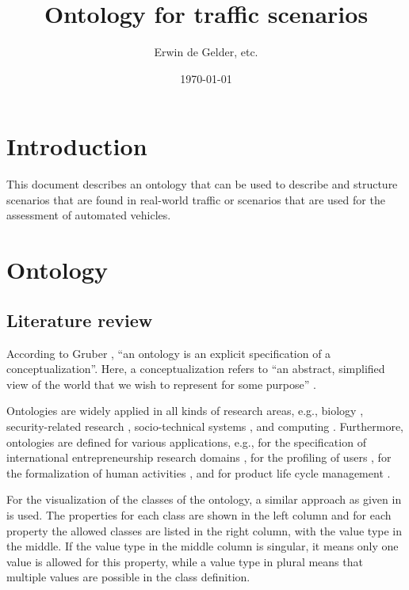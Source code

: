 \documentclass[10pt,final,a4paper,oneside,onecolumn]{article}
\def\reptitle{Ontology for traffic scenarios}
\def\repauthor{Erwin de Gelder, etc.}
\theoremstyle{plain}\newtheorem{definition}{Definition}[section]    %
\theoremstyle{definition}\newtheorem{example}{Example}[section]     %
\theoremstyle{remark}\newtheorem{remarkenv}{Remark}[section]        %
\begin{document}

\title{\textbf{\reptitle}}
\author{\repauthor}
\date{\today}
\maketitle

\tableofcontents

\newpage

\section{Introduction}
\label{sec:introduction}

This document describes an ontology that can be used to describe and structure scenarios that are found in real-world traffic or scenarios that are used for the assessment of automated vehicles.

\section{Ontology}
\label{sec:ontology}

\subsection{Literature review}
\label{sec:ontology literature}

According to Gruber \cite{gruber1993ontology}, ``an ontology is an explicit specification of a conceptualization''. Here, a conceptualization refers to ``an abstract, simplified view of the world that we wish to represent for some purpose'' \cite{gruber1993ontology}. 

Ontologies are widely applied in all kinds of research areas, e.g., biology \cite{gkoutos2004mouse}, security-related research \cite{kim2005security}, socio-technical systems \cite{vanDamPhDThesis2009}, and computing \cite{chen2004soupa,chen2003ontology}. Furthermore, ontologies are defined for various applications, e.g., for the specification of international entrepreneurship research domains \cite{jones2011international}, for the profiling of users \cite{golemati2007creating}, for the formalization of human activities \cite{lee2017location}, and for product life cycle management \cite{matsokis2010plm}.

For the visualization of the classes of the ontology, a similar approach as given in \cite{vanDamPhDThesis2009} is used. The properties for each class are shown in the left column and for each property the allowed classes are listed in the right column, with the value type in the middle. If the value type in the middle column is singular, it means only one value is allowed for this property, while a value type in plural means that multiple values are possible in the class definition.
\end{document}
